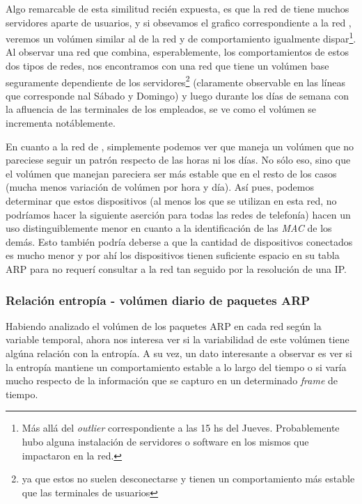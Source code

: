 \par Algo remarcable de esta similitud reci\'en expuesta, es que la red de
 tiene muchos servidores aparte de usuarios, y si obsevamos
el grafico correspondiente a la red , veremos un vol\'umen
similar al de la red  y de comportamiento igualmente
dispar\footnote{M\'as all\'a del \textit{outlier} correspondiente a las
15 hs del Jueves. Probablemente hubo alguna instalaci\'on de servidores o
software en los mismos que impactaron en la red.}. Al observar
una red que combina, esperablemente, los comportamientos de estos dos tipos
de redes, nos encontramos con una red que tiene un vol\'umen base seguramente
dependiente de los servidores\footnote{ya que estos no suelen desconectarse y
tienen un comportamiento m\'as estable que las terminales de usuarios}
(claramente observable en las l\'ineas que corresponde nal S\'abado y Domingo)
y luego durante los d\'ias de semana con la afluencia de las terminales de
los empleados, se ve como el vol\'umen se incrementa not\'ablemente.

\par En cuanto a la red de , simplemente podemos ver
que maneja un vol\'umen que no pareciese seguir un patr\'on respecto
de las horas ni los d\'ias. No s\'olo eso, sino que el vol\'umen que manejan
pareciera ser m\'as estable que en el resto de los casos (mucha menos
variaci\'on de vol\'umen por hora y d\'ia). As\'i pues, podemos determinar
que estos dispositivos (al menos los que se utilizan en esta red, no podr\'iamos
hacer la siguiente aserci\'on para todas las redes de telefon\'ia) hacen un
uso distinguiblemente menor en cuanto a la identificaci\'on de las \textit{MAC}
de los dem\'as. Esto tambi\'en podr\'ia deberse a que la cantidad de dispositivos
conectados es mucho menor y por ah\'i los dispositivos tienen suficiente
espacio en su tabla ARP para no requer\'i consultar a la red tan seguido por la
resoluci\'on de una IP.


\subsubsection{Relaci\'on entrop\'ia - vol\'umen diario de paquetes ARP}
\par Habiendo analizado el vol\'umen de los paquetes ARP en cada red
seg\'un la variable temporal, ahora nos interesa ver si la variabilidad
de este vol\'umen tiene alg\'una relaci\'on con la entrop\'ia. A su vez,
un dato interesante a observar es ver si la entrop\'ia mantiene un comportamiento
estable a lo largo del tiempo o si var\'ia mucho respecto de la informaci\'on
que se capturo en un determinado \textit{frame} de tiempo.

